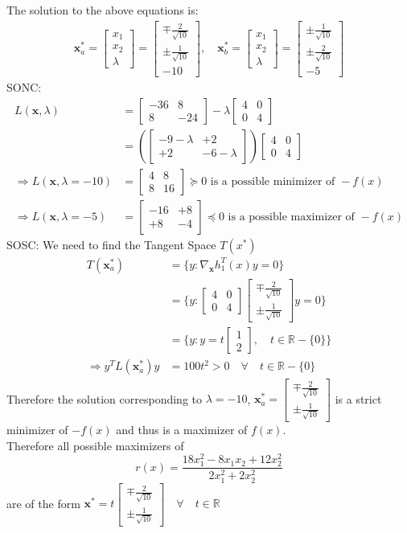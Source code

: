 \documentclass[a4paper,11pt]{article}
\newcommand{\V}[1]{\pmb{#1}}
\newcommand{\mat}[1]{\begin{bmatrix}#1\end{bmatrix}}
\begin{document}
The solution to the above equations is:
\begin{align*}
 \V{x}^*_a = \mat{x_1\\x_2\\\lambda}=\mat{\mp\frac{2}{\sqrt{10}} \\ \pm\frac{1}{\sqrt{10}}\\-10},\quad 
 \V{x}^*_b =\mat{x_1\\x_2\\\lambda}=\mat{\pm\frac{1}{\sqrt{10}} \\ \pm\frac{2}{\sqrt{10}}\\-5}
\end{align*}
SONC:
\begin{align*}
 L(\V{x},\lambda) &=\mat{-36& 8\\8& -24} -\lambda\mat{4&0\\0&4}\\
 & = (\mat{-9-\lambda& +2\\+2& -6-\lambda})\mat{4&0\\0&4}\\
 \Rightarrow L(\V{x},\lambda=-10) &= \mat{4& 8\\8& 16} \succcurlyeq 0 \text{ is a possible minimizer of } -f(x)\\
 \Rightarrow L(\V{x},\lambda=-5) &= \mat{-16& +8\\+8& -4}\preccurlyeq 0 \text{ is a possible maximizer of } -f(x)
\end{align*}
SOSC: We need to find the Tangent Space $T(x^*)$
\begin{align*}
T(\V{x}^*_a) & = \{y: \nabla_{\V{x}}h_1^T(x)y = 0   \}\\
& = \{y: \mat{4&0\\0&4}\mat{\mp\frac{2}{\sqrt{10}} \\ \pm\frac{1}{\sqrt{10}}}y = 0   \}\\
&=\{y: y = t\mat{1\\2},\quad t\in\mathbb{R}-\{0\}\}\\
\Rightarrow y^TL(\V{x}^*_a)y &= 100t^2 > 0 \quad \forall \quad t\in\mathbb{R}-\{0\}
\end{align*}
Therefore the solution corresponding to $\lambda=-10$, $\V{x}^*_a =\mat{\mp\frac{2}{\sqrt{10}} \\ \pm\frac{1}{\sqrt{10}}}$ is a strict minimizer of $-f(x)$ and thus is a maximizer of $f(x)$.\\ 

\noindent Therefore all possible maximizers of $$r(x) = \frac{18x_1^2 - 8x_1x_2 +12x_2^2}{2x_1^2 + 2x_2^2}$$
are of the form $\V{x}^* =t\mat{\mp\frac{2}{\sqrt{10}} \\ \pm\frac{1}{\sqrt{10}}} \quad \forall \quad t \in \mathbb{R}$
\end{document}
